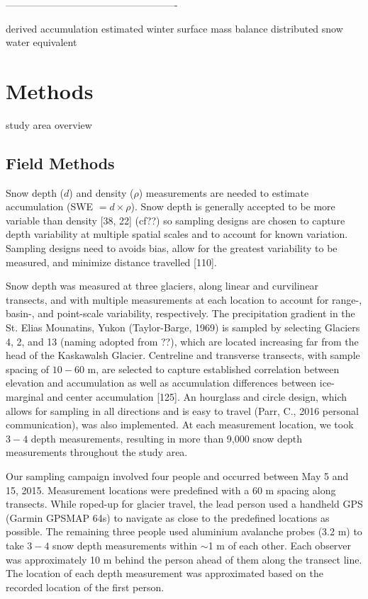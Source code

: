 \documentclass[twoside,twocolumn]{article}
\begin{document}
----------------------------------------------------

derived accumulation
estimated winter surface mass balance
distributed snow water equivalent

\pagebreak
\section{Methods}

study area overview

\subsection{Field Methods}

Snow depth ($d$) and density ($\rho$) measurements are needed to estimate accumulation (SWE $= d \times \rho$). Snow depth is generally accepted to be more variable than density  [38, 22] (cf??) so sampling designs are chosen to capture depth variability at multiple spatial scales and to account for known variation. Sampling designs need to avoids bias, allow for the greatest variability to be measured, and minimize distance travelled [110].

Snow depth was measured at three glaciers, along linear and curvilinear transects, and with multiple measurements at each location to account for range-, basin-, and point-scale variability, respectively. The precipitation gradient in the St. Elias Mounatins, Yukon (Taylor-Barge, 1969) is sampled by selecting Glaciers 4, 2, and 13 (naming adopted from ??), which are located increasing far from the head of the Kaskawalsh Glacier. Centreline and transverse transects, with sample spacing of $10-60$ m, are selected to capture established correlation between elevation and accumulation as well as accumulation differences between ice-marginal and center accumulation [125]. An hourglass and circle design, which allows for sampling in all directions and is easy to travel (Parr, C., 2016 personal communication), was also implemented. At each measurement location, we took $3-4$ depth measurements, resulting in more than 9,000 snow depth measurements throughout the study area. 

Our sampling campaign involved four people and occurred between May 5 and 15, 2015.
Measurement locations were predefined with a 60 m spacing along transects. While roped-up for glacier travel, the lead person used a handheld GPS (Garmin GPSMAP 64s) to navigate as close to the predefined locations as possible. The remaining three people used aluminium avalanche probes (3.2 m) to take $3-4$ snow depth measurements within $\sim$1 m of each other. Each observer was approximately 10 m behind the person ahead of them along the transect line. The location of each depth measurement was approximated based on the recorded location of the first person. 
\end{document}
